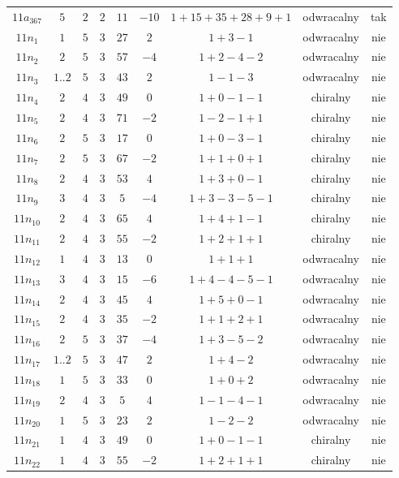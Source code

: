 \begin{longtable}{ccccccccc}
$11a_{367}$ & $5$ & $2$ & $2$ & $11$ & $-10$ & $1+15+35+28+9+1$ & odwracalny & tak \\
$11n_{1}$ & $1$ & $5$ & $3$ & $27$ & $2$ & $1+3-1$ & odwracalny & nie \\
$11n_{2}$ & $2$ & $5$ & $3$ & $57$ & $-4$ & $1+2-4-2$ & odwracalny & nie \\
$11n_{3}$ & $1..2$ & $5$ & $3$ & $43$ & $2$ & $1-1-3$ & odwracalny & nie \\
$11n_{4}$ & $2$ & $4$ & $3$ & $49$ & $0$ & $1+0-1-1$ & chiralny & nie \\
$11n_{5}$ & $2$ & $4$ & $3$ & $71$ & $-2$ & $1-2-1+1$ & chiralny & nie \\
$11n_{6}$ & $2$ & $5$ & $3$ & $17$ & $0$ & $1+0-3-1$ & chiralny & nie \\
$11n_{7}$ & $2$ & $5$ & $3$ & $67$ & $-2$ & $1+1+0+1$ & chiralny & nie \\
$11n_{8}$ & $2$ & $4$ & $3$ & $53$ & $4$ & $1+3+0-1$ & chiralny & nie \\
$11n_{9}$ & $3$ & $4$ & $3$ & $5$ & $-4$ & $1+3-3-5-1$ & chiralny & nie \\
$11n_{10}$ & $2$ & $4$ & $3$ & $65$ & $4$ & $1+4+1-1$ & chiralny & nie \\
$11n_{11}$ & $2$ & $4$ & $3$ & $55$ & $-2$ & $1+2+1+1$ & chiralny & nie \\
$11n_{12}$ & $1$ & $4$ & $3$ & $13$ & $0$ & $1+1+1$ & odwracalny & nie \\
$11n_{13}$ & $3$ & $4$ & $3$ & $15$ & $-6$ & $1+4-4-5-1$ & odwracalny & nie \\
$11n_{14}$ & $2$ & $4$ & $3$ & $45$ & $4$ & $1+5+0-1$ & odwracalny & nie \\
$11n_{15}$ & $2$ & $4$ & $3$ & $35$ & $-2$ & $1+1+2+1$ & odwracalny & nie \\
$11n_{16}$ & $2$ & $5$ & $3$ & $37$ & $-4$ & $1+3-5-2$ & odwracalny & nie \\
$11n_{17}$ & $1..2$ & $5$ & $3$ & $47$ & $2$ & $1+4-2$ & odwracalny & nie \\
$11n_{18}$ & $1$ & $5$ & $3$ & $33$ & $0$ & $1+0+2$ & odwracalny & nie \\
$11n_{19}$ & $2$ & $4$ & $3$ & $5$ & $4$ & $1-1-4-1$ & odwracalny & nie \\
$11n_{20}$ & $1$ & $5$ & $3$ & $23$ & $2$ & $1-2-2$ & odwracalny & nie \\
$11n_{21}$ & $1$ & $4$ & $3$ & $49$ & $0$ & $1+0-1-1$ & chiralny & nie \\
$11n_{22}$ & $1$ & $4$ & $3$ & $55$ & $-2$ & $1+2+1+1$ & chiralny & nie \\

\end{longtable}
